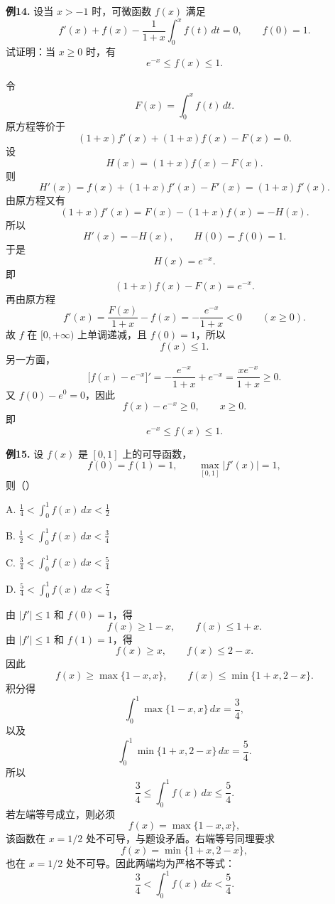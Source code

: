 \begin{problemblock}
\textbf{例14.} 设当 \(x>-1\) 时，可微函数 \(f(x)\) 满足
\[
f'(x)+f(x)-\frac1{1+x}\int_0^x f(t)\,dt=0,
\qquad f(0)=1.
\]
试证明：当 \(x\ge0\) 时，有
\[
e^{-x}\le f(x)\le1.
\]
\end{problemblock}
\begin{solutionblock}
令
\[
F(x)=\int_0^x f(t)\,dt.
\]
原方程等价于
\[
(1+x)f'(x)+(1+x)f(x)-F(x)=0.
\]
设
\[
H(x)=(1+x)f(x)-F(x).
\]
则
\[
H'(x)=f(x)+(1+x)f'(x)-F'(x)=(1+x)f'(x).
\]
由原方程又有
\[
(1+x)f'(x)=F(x)-(1+x)f(x)=-H(x).
\]
所以
\[
H'(x)=-H(x),\qquad H(0)=f(0)=1.
\]
于是
\[
H(x)=e^{-x}.
\]
即
\[
(1+x)f(x)-F(x)=e^{-x}.
\]
再由原方程
\[
f'(x)=\frac{F(x)}{1+x}-f(x)
=-\frac{e^{-x}}{1+x}<0\qquad(x\ge0).
\]
故 \(f\) 在 \([0,+\infty)\) 上单调递减，且 \(f(0)=1\)，所以
\[
f(x)\le1.
\]
另一方面，
\[
\bigl[f(x)-e^{-x}\bigr]'
=-\frac{e^{-x}}{1+x}+e^{-x}
=\frac{x e^{-x}}{1+x}\ge0.
\]
又 \(f(0)-e^0=0\)，因此
\[
f(x)-e^{-x}\ge0,\qquad x\ge0.
\]
即
\[
e^{-x}\le f(x)\le1.
\]
\end{solutionblock}

\begin{problemblock}
\textbf{例15.} 设 \(f(x)\) 是 \([0,1]\) 上的可导函数，
\[
f(0)=f(1)=1,\qquad \max_{[0,1]}|f'(x)|=1,
\]
则（\quad）

A. \(\displaystyle \frac14<\int_0^1 f(x)\,dx<\frac12\)

B. \(\displaystyle \frac12<\int_0^1 f(x)\,dx<\frac34\)

C. \(\displaystyle \frac34<\int_0^1 f(x)\,dx<\frac54\)

D. \(\displaystyle \frac54<\int_0^1 f(x)\,dx<\frac74\)
\end{problemblock}
\begin{solutionblock}
由 \(|f'|\le1\) 和 \(f(0)=1\)，得
\[
f(x)\ge1-x,\qquad f(x)\le1+x.
\]
由 \(|f'|\le1\) 和 \(f(1)=1\)，得
\[
f(x)\ge x,\qquad f(x)\le2-x.
\]
因此
\[
f(x)\ge\max\{1-x,x\},
\qquad
f(x)\le\min\{1+x,2-x\}.
\]
积分得
\[
\int_0^1\max\{1-x,x\}\,dx=\frac34,
\]
以及
\[
\int_0^1\min\{1+x,2-x\}\,dx=\frac54.
\]
所以
\[
\frac34\le\int_0^1f(x)\,dx\le\frac54.
\]
若左端等号成立，则必须
\[
f(x)=\max\{1-x,x\},
\]
该函数在 \(x=1/2\) 处不可导，与题设矛盾。右端等号同理要求
\[
f(x)=\min\{1+x,2-x\},
\]
也在 \(x=1/2\) 处不可导。因此两端均为严格不等式：
\[
\frac34<\int_0^1f(x)\,dx<\frac54.
\]
\end{solutionblock}
